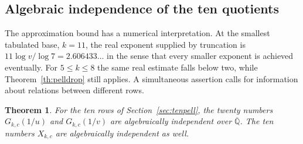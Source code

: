 \documentclass[11pt,a4paper]{article}
\newcommand{\Q}{\mathbb Q}\newcommand{\Z}{\mathbb Z}\newcommand{\PP}{\mathbb P}\newcommand{\SL}{\mathrm{SL}}
\newtheorem{theorem}{Theorem}[section]
\begin{document}
\subsection{Algebraic independence of the ten quotients}\label{sec:mahler}
The approximation bound has a numerical interpretation. At the smallest
tabulated base, $k=11$, the real exponent supplied by truncation is
$11\log v/\log 7=2.606433\ldots$ in the sense that every smaller exponent
is achieved eventually. For $5\le k\le8$ the same real estimate falls
below two, while Theorem~\ref{th:pelldrop} still applies.
A simultaneous assertion calls for information about relations between different rows.

\begin{theorem}\label{th:joint}
For the ten rows of Section~\ref{sec:tenpell}, the twenty numbers
$G_{k,c}(1/u)$ and $G_{k,c}(1/v)$ are algebraically independent over
$\overline{\Q}$. The ten numbers $X_{k,c}$ are algebraically independent as well.
\end{theorem}
\end{document}
